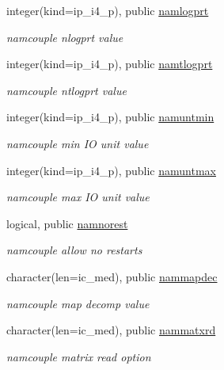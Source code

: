 \begin{DoxyCompactItemize}
integer(kind=ip\+\_\+i4\+\_\+p), public \hyperlink{namespacemod__oasis__namcouple_a46affda5336f60a1eeb1badaaccd3cfd}{namlogprt}
\begin{DoxyCompactList}\small\item\em namcouple nlogprt value \end{DoxyCompactList}\item 
integer(kind=ip\+\_\+i4\+\_\+p), public \hyperlink{namespacemod__oasis__namcouple_a45fbbd2941f5d71991d409f63e31cf02}{namtlogprt}
\begin{DoxyCompactList}\small\item\em namcouple ntlogprt value \end{DoxyCompactList}\item 
integer(kind=ip\+\_\+i4\+\_\+p), public \hyperlink{namespacemod__oasis__namcouple_a1b8c7ce28c62fa0b15076b7169d8b454}{namuntmin}
\begin{DoxyCompactList}\small\item\em namcouple min IO unit value \end{DoxyCompactList}\item 
integer(kind=ip\+\_\+i4\+\_\+p), public \hyperlink{namespacemod__oasis__namcouple_ae750107f9401fd3c7348088ad3095b45}{namuntmax}
\begin{DoxyCompactList}\small\item\em namcouple max IO unit value \end{DoxyCompactList}\item 
logical, public \hyperlink{namespacemod__oasis__namcouple_ad1bd3ea485ad5f5114eb4b7f8c831ccb}{namnorest}
\begin{DoxyCompactList}\small\item\em namcouple allow no restarts \end{DoxyCompactList}\item 
character(len=ic\+\_\+med), public \hyperlink{namespacemod__oasis__namcouple_a484aaf8a6d7eaa0675a8249fa94509cf}{nammapdec}
\begin{DoxyCompactList}\small\item\em namcouple map decomp value \end{DoxyCompactList}\item 
character(len=ic\+\_\+med), public \hyperlink{namespacemod__oasis__namcouple_ad9ac6585de157a05d793636addf672a5}{nammatxrd}
\begin{DoxyCompactList}\small\item\em namcouple matrix read option \end{DoxyCompactList}\item 

\end{DoxyCompactItemize}
